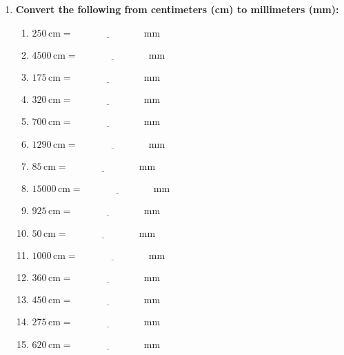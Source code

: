 \documentclass[12pt]{article}
\begin{document}
\begin{enumerate}
    \item \textbf{Convert the following from centimeters (cm) to millimeters (mm):}
    \begin{multicols}{2}
    \begin{enumerate}
        \item \(250 \, \text{cm} = \underline{\hspace{3cm}} \, \text{mm}\)
        \item \(4500 \, \text{cm} = \underline{\hspace{3cm}} \, \text{mm}\)
        \item \(175 \, \text{cm} = \underline{\hspace{3cm}} \, \text{mm}\)
        \item \(320 \, \text{cm} = \underline{\hspace{3cm}} \, \text{mm}\)
        \item \(700 \, \text{cm} = \underline{\hspace{3cm}} \, \text{mm}\)
        \item \(1290 \, \text{cm} = \underline{\hspace{3cm}} \, \text{mm}\)
        \item \(85 \, \text{cm} = \underline{\hspace{3cm}} \, \text{mm}\)
        \item \(15000 \, \text{cm} = \underline{\hspace{3cm}} \, \text{mm}\)
        \item \(925 \, \text{cm} = \underline{\hspace{3cm}} \, \text{mm}\)
        \item \(50 \, \text{cm} = \underline{\hspace{3cm}} \, \text{mm}\)
        \item \(1000 \, \text{cm} = \underline{\hspace{3cm}} \, \text{mm}\)
        \item \(360 \, \text{cm} = \underline{\hspace{3cm}} \, \text{mm}\)
        \item \(450 \, \text{cm} = \underline{\hspace{3cm}} \, \text{mm}\)
        \item \(275 \, \text{cm} = \underline{\hspace{3cm}} \, \text{mm}\)
        \item \(620 \, \text{cm} = \underline{\hspace{3cm}} \, \text{mm}\)
    \end{enumerate}
    \end{multicols}
\end{enumerate}
\end{document}
